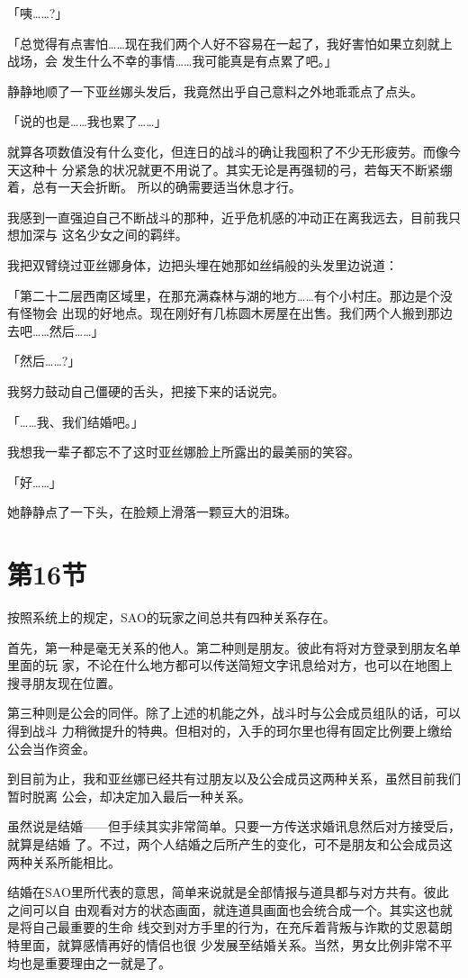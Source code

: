 \documentclass[11pt]{book}
\begin{document}
「咦……?」

「总觉得有点害怕……现在我们两个人好不容易在一起了，我好害怕如果立刻就上战场，会
发生什么不幸的事情……我可能真是有点累了吧。」

静静地顺了一下亚丝娜头发后，我竟然出乎自己意料之外地乖乖点了点头。

「说的也是……我也累了……」

就算各项数值没有什么变化，但连日的战斗的确让我囤积了不少无形疲劳。而像今天这种十
分紧急的状况就更不用说了。其实无论是再强韧的弓，若每天不断紧绷着，总有一天会折断。
所以的确需要适当休息才行。

我感到一直强迫自己不断战斗的那种，近乎危机感的冲动正在离我远去，目前我只想加深与
这名少女之间的羁绊。

我把双臂绕过亚丝娜身体，边把头埋在她那如丝绢般的头发里边说道：

「第二十二层西南区域里，在那充满森林与湖的地方……有个小村庄。那边是个没有怪物会
出现的好地点。现在刚好有几栋圆木房屋在出售。我们两个人搬到那边去吧……然后……」

「然后……?」

我努力鼓动自己僵硬的舌头，把接下来的话说完。

「……我、我们结婚吧。」

我想我一辈子都忘不了这时亚丝娜脸上所露出的最美丽的笑容。

「好……」

她静静点了一下头，在脸颊上滑落一颗豆大的泪珠。
\section{第16节}
\label{sec:orgbdcd811}
按照系统上的规定，SAO的玩家之间总共有四种关系存在。

首先，第一种是毫无关系的他人。第二种则是朋友。彼此有将对方登录到朋友名单里面的玩
家，不论在什么地方都可以传送简短文字讯息给对方，也可以在地图上搜寻朋友现在位置。

第三种则是公会的同伴。除了上述的机能之外，战斗时与公会成员组队的话，可以得到战斗
力稍微提升的特典。但相对的，入手的珂尔里也得有固定比例要上缴给公会当作资金。

到目前为止，我和亚丝娜已经共有过朋友以及公会成员这两种关系，虽然目前我们暂时脱离
公会，却决定加入最后一种关系。

虽然说是结婚——但手续其实非常简单。只要一方传送求婚讯息然后对方接受后，就算是结婚
了。不过，两个人结婚之后所产生的变化，可不是朋友和公会成员这两种关系所能相比。

结婚在SAO里所代表的意思，简单来说就是全部情报与道具都与对方共有。彼此之间可以自
由观看对方的状态画面，就连道具画面也会统合成一个。其实这也就是将自己最重要的生命
线交到对方手里的行为，在充斥着背叛与诈欺的艾恩葛朗特里面，就算感情再好的情侣也很
少发展至结婚关系。当然，男女比例非常不平均也是重要理由之一就是了。
\end{document}
